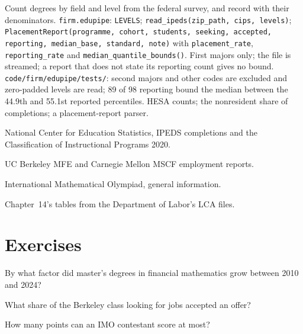 \begin{build}
 Count degrees by field and level from the federal survey, and record  with their
denominators.
 \texttt{firm.edupipe}: \texttt{LEVELS}; \texttt{read\_ipeds(zip\_path, cips, levels)};
\texttt{PlacementReport(programme, cohort, students, seeking, accepted, reporting, median\_base, standard, note)} with
\texttt{placement\_rate}, \texttt{reporting\_rate} and \texttt{median\_quantile\_bounds()}.
 First majors only; the file is streamed; a report that does not state its reporting count gives no bound.
 \texttt{code/firm/edupipe/tests/}: second majors and other codes are excluded and zero-padded
levels are read; 89 of 98 reporting bound the median between the 44.9th and 55.1st reported percentiles.
 HESA counts; the nonresident share of completions; a placement-report parser.
\end{build}

\begin{omsources}
\item National Center for Education Statistics, IPEDS completions and the Classification of Instructional Programs 2020.
\item UC Berkeley MFE and Carnegie Mellon MSCF employment reports.
\item International Mathematical Olympiad, general information.
\item Chapter~14's tables from the Department of Labor's LCA files.
\end{omsources}

\section{Exercises}

\begin{exercise}[$\star$]\label{exo:in:education-pipelines:1}
By what factor did master's degrees in financial mathematics grow between 2010 and 2024?
\end{exercise}

\begin{exercise}[$\star$]\label{exo:in:education-pipelines:2}
What share of the Berkeley class looking for jobs accepted an offer?
\end{exercise}

\begin{exercise}[$\star$]\label{exo:in:education-pipelines:3}
How many points can an IMO contestant score at most?
\end{exercise}

